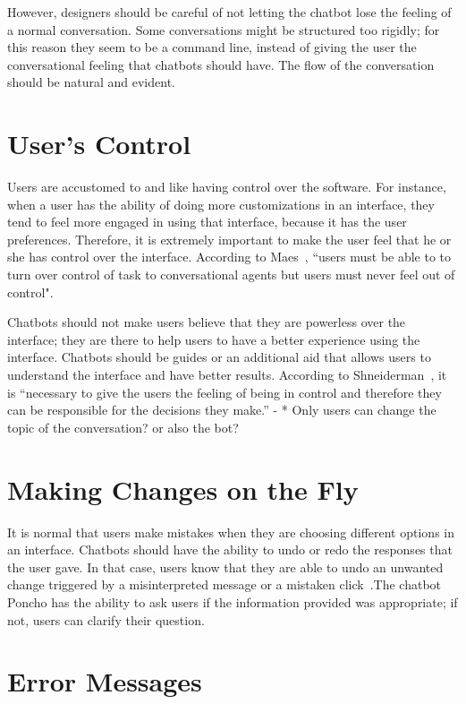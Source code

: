 \documentclass[a4paper,10pt]{article}
\begin{document}
However, designers should be careful of not letting the chatbot lose the feeling of a normal conversation. Some conversations might be structured too rigidly; for this reason they seem to be a command line, instead of giving the user the conversational feeling that chatbots should have. The flow of the conversation should be natural and evident. 

\section{User's Control}

Users are accustomed to and like having control over the software. For instance, when a user has the ability of doing more customizations in an interface, they tend to feel more engaged in using that interface, because it has the user preferences. Therefore, it is extremely important to make the user feel that he or she has control over the interface. According to Maes~\cite{shneiderman1997direct}, ``users must be able to to turn over control of task to conversational agents but users must never feel out of control".

Chatbots should not make users believe that they are powerless over the interface; they are there to help users to have a better experience using the interface. Chatbots should be guides or an additional aid that allows users to understand the interface and have better results. According to Shneiderman~\cite{shneiderman1997direct}, it is ``necessary to give the users the feeling of being in control and therefore they can be responsible for the decisions they make.” - * Only users can change the topic of the conversation? or also the bot?

\section{Making Changes on the Fly}

It is normal that users make mistakes when they are choosing different options in an interface. Chatbots should have the ability to undo or redo the responses that the user gave. In that case, users know that they are able to undo an unwanted change triggered by a misinterpreted message or a mistaken click~\cite{HeuristicsWebPage}.The chatbot Poncho has the ability to ask users if the information provided was appropriate; if not, users can clarify their question. 

\section{Error Messages}
\end{document}

